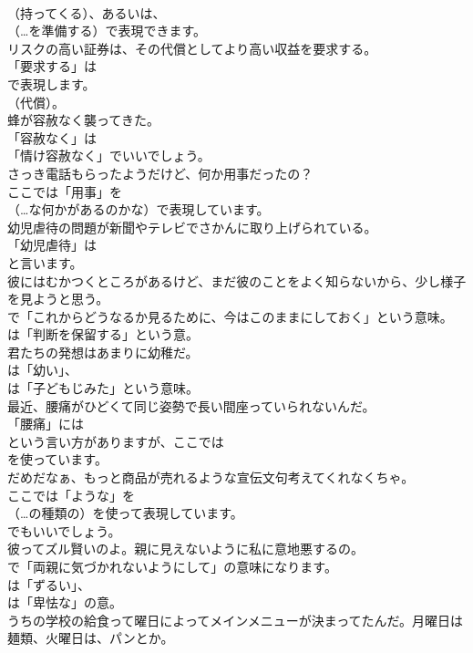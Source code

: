 \documentclass[8pt]{extreport}
\begin{document}
\begin{CJK}{UTF8}{min}
\\	（持ってくる）、あるいは、
\\	（…を準備する）で表現できます。	
\\	リスクの高い証券は、その代償としてより高い収益を要求する。 
\\	「要求する」は
\\	で表現します。
\\	（代償）。	
\\	蜂が容赦なく襲ってきた。 
\\	「容赦なく」は
\\	「情け容赦なく」でいいでしょう。	
\\	さっき電話もらったようだけど、何か用事だったの？ 
\\	ここでは「用事」を
\\	（…な何かがあるのかな）で表現しています。	
\\	幼児虐待の問題が新聞やテレビでさかんに取り上げられている。 
\\	「幼児虐待」は
\\	と言います。	
\\	彼にはむかつくところがあるけど、まだ彼のことをよく知らないから、少し様子を見ようと思う。 
\\	で「これからどうなるか見るために、今はこのままにしておく」という意味。
\\	は「判断を保留する」という意。	
\\	君たちの発想はあまりに幼稚だ。 
\\	は「幼い」、
\\	は「子どもじみた」という意味。	
\\	最近、腰痛がひどくて同じ姿勢で長い間座っていられないんだ。 
\\	「腰痛」には
\\	という言い方がありますが、ここでは
\\	を使っています。	
\\	だめだなぁ、もっと商品が売れるような宣伝文句考えてくれなくちゃ。 
\\	ここでは「ような」を 
\\	（…の種類の）を使って表現しています。
\\	でもいいでしょう。	
\\	彼ってズル賢いのよ。親に見えないように私に意地悪するの。 
\\	で「両親に気づかれないようにして」の意味になります。
\\	は「ずるい」、
\\	は「卑怯な」の意。	
\\	うちの学校の給食って曜日によってメインメニューが決まってたんだ。月曜日は麺類、火曜日は、パンとか。 

\end{CJK}
\end{document}
